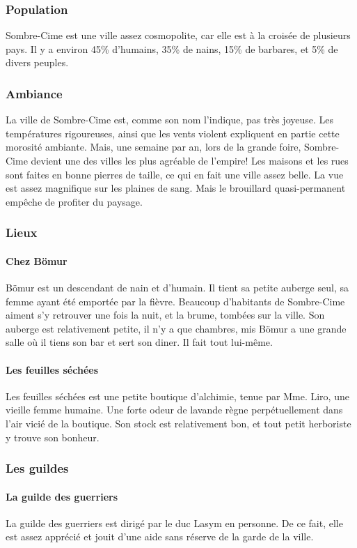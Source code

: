 \subsubsection{Population}
Sombre-Cime est une ville assez cosmopolite, car elle est à la croisée de plusieurs pays.
Il y a environ 45\% d'humains, 35\% de nains, 15\% de barbares, et 5\% de divers peuples.
\subsubsection{Ambiance}
La ville de Sombre-Cime est, comme son nom l'indique, pas très joyeuse. 
Les températures rigoureuses, ainsi que les vents violent expliquent en partie cette morosité ambiante.
Mais, une semaine par an, lors de la grande foire, Sombre-Cime devient une des villes les plus agréable de l'empire!
Les maisons et les rues sont faites en bonne pierres de taille, ce qui en fait une ville assez belle.
La vue est assez magnifique sur les plaines de sang. 
Mais le brouillard quasi-permanent empêche de profiter du paysage.
\subsubsection{Lieux}
\paragraph{Chez Bömur}
Bömur est un descendant de nain et d'humain. 
Il tient sa petite auberge seul, sa femme ayant été emportée par la fièvre.
Beaucoup d'habitants de Sombre-Cime aiment s'y retrouver une fois la nuit, et la brume, tombées sur la ville.
Son auberge est relativement petite, il n'y a que  chambres, mis Bömur a une grande salle où il tiens son bar et sert son diner.
Il fait tout lui-même.
\paragraph{Les feuilles séchées}
Les feuilles séchées est une petite boutique d’alchimie, tenue par Mme. Liro, une vieille femme humaine. Une forte odeur de lavande règne perpétuellement dans l’air vicié de la boutique. Son stock est relativement bon, et tout petit herboriste y trouve son bonheur. 
\subsubsection{Les guildes}
\paragraph{La guilde des guerriers}
La guilde des guerriers est dirigé par le duc Lasym en personne. De ce fait, elle est assez apprécié et jouit d’une aide sans réserve de la garde de la ville.
